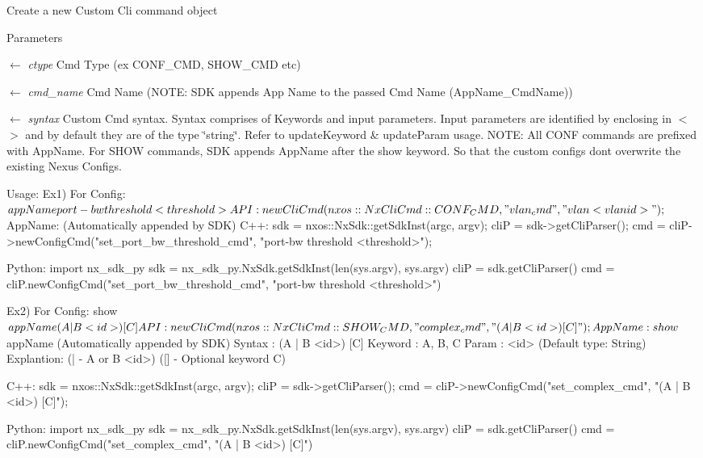 \label{classnxos_1_1NxCliParser_a210cbbb8b312093285741f753c4cdcda}
Create a new Custom Cli command object 
\begin{DoxyParams}{Parameters}
\item[\mbox{$\leftarrow$} {\em ctype}]Cmd Type (ex CONF\_\-CMD, SHOW\_\-CMD etc) \item[\mbox{$\leftarrow$} {\em cmd\_\-name}]Cmd Name (NOTE: SDK appends App Name to the passed Cmd Name (AppName\_\-CmdName)) \item[\mbox{$\leftarrow$} {\em syntax}]Custom Cmd syntax. Syntax comprises of Keywords and input parameters. Input parameters are identified by enclosing in $<$$>$ and by default they are of the type \char`\"{}string\char`\"{}. Refer to updateKeyword \& updateParam usage. NOTE: All CONF commands are prefixed with AppName. For SHOW commands, SDK appends AppName after the show keyword. So that the custom configs dont overwrite the existing Nexus Configs.\end{DoxyParams}

\begin{DoxyCode}
  Usage:                             
       Ex1) For Config: $appName port-bw threshold <threshold>
             API:  newCliCmd(nxos::NxCliCmd::CONF_CMD, "vlan_cmd", "vlan <vlanid>
      ");
             $AppName: (Automatically appended by SDK)
  C++:
       sdk = nxos::NxSdk::getSdkInst(argc, argv);
       cliP = sdk->getCliParser();
       cmd = cliP->newConfigCmd("set_port_bw_threshold_cmd",
                                    "port-bw threshold <threshold>");

  Python:
       import nx_sdk_py
       sdk = nx_sdk_py.NxSdk.getSdkInst(len(sys.argv), sys.argv)
       cliP = sdk.getCliParser()
       cmd = cliP.newConfigCmd("set_port_bw_threshold_cmd", 
                               "port-bw threshold <threshold>")
\end{DoxyCode}



\begin{DoxyCode}
       Ex2) For Config: show $appName (A | B <id>) [C] 
             API:  newCliCmd(nxos::NxCliCmd::SHOW_CMD, "complex_cmd", "(A | B <id
      >) [C]");
             App Name: show $appName (Automatically appended by SDK)
             Syntax  : (A | B <id>) [C]
                 Keyword   : A, B, C
                 Param     : <id> (Default type: String)
                 Explantion: (| - A or B <id>) 
                             ([] - Optional keyword C)
 
  C++:
       sdk = nxos::NxSdk::getSdkInst(argc, argv);
       cliP = sdk->getCliParser();
       cmd = cliP->newConfigCmd("set_complex_cmd",
                                "(A | B <id>) [C]");

  Python:
       import nx_sdk_py
       sdk = nx_sdk_py.NxSdk.getSdkInst(len(sys.argv), sys.argv)
       cliP = sdk.getCliParser()
       cmd = cliP.newConfigCmd("set_complex_cmd", "(A | B <id>) [C]") 
\end{DoxyCode}


